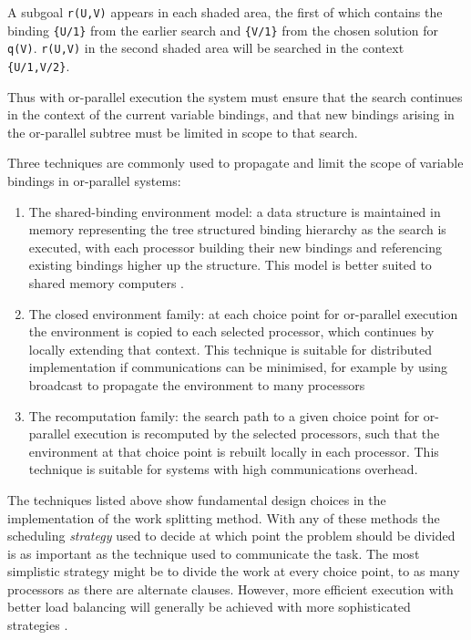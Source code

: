 A subgoal \texttt{r(U,V)} appears in each shaded area, the first of which 
contains the binding \texttt{\{U/1\}} from the earlier search and \texttt{\{V/1\}}
from the chosen solution for \texttt{q(V)}.  \texttt{r(U,V)} in
the second shaded area will be searched in the context
\texttt{\{U/1,V/2\}}.

Thus with or-parallel execution the system must ensure that the search continues
in the context of the current variable bindings, and that new bindings arising in
the or-parallel subtree must be limited in scope to that search.

Three techniques are commonly used to propagate and limit the scope of variable
bindings in or-parallel systems:
\begin{enumerate}
\item{The shared-binding environment model: a data structure is maintained in
  memory representing the tree structured binding hierarchy as the search is
  executed, with each processor building their new bindings and referencing
  existing bindings higher up the structure.  This model is better suited to
  shared memory computers \cite{DR92}.}
\item{The closed environment family: at each choice point for or-parallel
  execution the environment is copied to each selected processor, which
  continues by locally extending that context.  This technique is suitable for
  distributed implementation if communications can be minimised, for example
  by using broadcast to propagate the environment to many processors}
\item{The recomputation family: the search path to a given choice point for
  or-parallel execution is recomputed by the selected processors, such that
  the environment at that choice point is rebuilt locally in each processor.
  This technique is suitable for systems with high communications overhead.}
\end{enumerate}

The techniques listed above show fundamental design choices in the implementation
of the work splitting method.  With any of these methods the scheduling
\textit{strategy}
used to decide at which point the problem should be divided is as
important as the technique used to communicate the task.
The most simplistic strategy might be to divide the work at every choice point, to
as many processors as there are alternate clauses.  However, more efficient
execution with better load balancing will generally be achieved with more sophisticated
strategies \cite{Sar95, AKM91, Bea91}.

